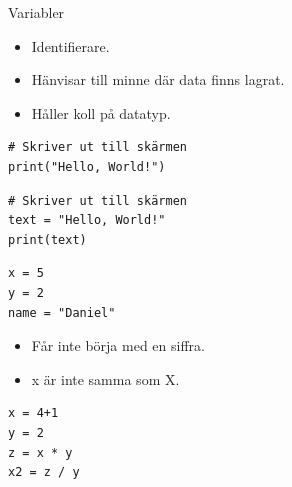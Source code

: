 \begin{frame}[fragile]
  \begin{block}{Variabler}
    \begin{itemize}
      \item Identifierare.
      \item Hänvisar till minne där data finns lagrat.
      \item Håller koll på datatyp.
    \end{itemize}
  \end{block}

  \pause

  \begin{example}
    \begin{verbatim}
# Skriver ut till skärmen
print("Hello, World!")
    \end{verbatim}
  \end{example}

  \begin{example}
    \begin{verbatim}
# Skriver ut till skärmen
text = "Hello, World!"
print(text)
    \end{verbatim}
  \end{example}
\end{frame}

\begin{frame}[fragile]
  \begin{example}[Variabler]
    \begin{verbatim}
x = 5
y = 2
name = "Daniel"
    \end{verbatim}
  \end{example}
\end{frame}

\begin{frame}
  \begin{remark}
    \begin{itemize}
      \item Får inte börja med en siffra.
      \item x är inte samma som X.
    \end{itemize}
  \end{remark}
\end{frame}

\begin{frame}[fragile]
  \begin{example}[Heltalsoperationer]
    \begin{verbatim}
x = 4+1
y = 2
z = x * y
x2 = z / y
    \end{verbatim}
  \end{example}
\end{frame}


